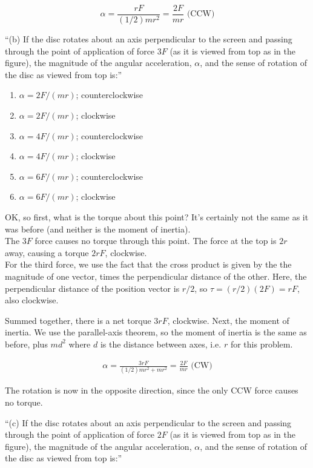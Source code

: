 \documentclass[8.01x]{subfiles}
\begin{document}
\begin{equation}
\alpha = \frac{r F}{(1/2) m r^2} = \frac{2 F}{m r} \text{ (CCW)}
\end{equation}

``(b) If the disc rotates about an axis perpendicular to the screen and passing through the point of application of force $3F$ (as it is viewed from top as in the figure), the magnitude of the angular acceleration, $\alpha$, and the sense of rotation of the disc as viewed from top is:''

\begin{enumerate}
\item $\alpha=2F/(mr)$; counterclockwise
\item $\alpha=2F/(mr)$; clockwise
\item $\alpha=4F/(mr)$; counterclockwise
\item $\alpha=4F/(mr)$; clockwise
\item $\alpha=6F/(mr)$; counterclockwise
\item $\alpha=6F/(mr)$; clockwise
\end{enumerate}

OK, so first, what is the torque about this point? It's certainly not the same as it was before (and neither is the moment of inertia).\\
The $3F$ force causes no torque through this point. The force at the top is $2r$ away, causing a torque $2 r F$, clockwise.\\
For the third force, we use the fact that the cross product is given by the the magnitude of one vector, times the perpendicular distance of the other. Here, the perpendicular distance of the position vector is $r/2$, so $\tau = (r/2)(2F) = r F$, also clockwise.

Summed together, there is a net torque $3 r F$, clockwise. Next, the moment of inertia. We use the parallel-axis theorem, so the moment of inertia is the same as before, plus $m d^2$ where $d$ is the distance between axes, i.e. $r$ for this problem.

\begin{align}
\alpha = \frac{3 r F}{(1/2) m r^2 + m r^2} = \frac{2 F}{m r} \text{ (CW)}
\end{align}

The rotation is now in the opposite direction, since the only CCW force causes no torque.

``(c) If the disc rotates about an axis perpendicular to the screen and passing through the point of application of force $2F$ (as it is viewed from top as in the figure), the magnitude of the angular acceleration, $\alpha$, and the sense of rotation of the disc as viewed from top is:''
\end{document}
